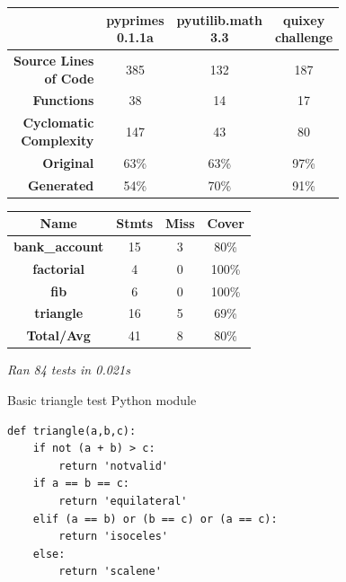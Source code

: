 \documentclass{icldt}
\numberwithin{equation}{section}       %
\begin{document}
{{\newcommand{\specialcell}[2][c]{%
  \begin{tabular}[#1]{@{}c@{}}#2\end{tabular}}
\begin{tabularx}{\textwidth}{ |r|c|c|c| }
	\hline
	& \specialcell{\textsf{pyprimes} \\ \textsf{0.1.1a}} & \specialcell{\textsf{pyutilib.math} \\ \textsf{3.3}} & \specialcell{\textsf{quixey} \\ \textsf{challenge}} \\
	\hline
	\specialcell{\textbf{Source Lines} \\ \textbf{of Code}} & 385 & 132 & 187 \\
	\hline
	\textbf{Functions} & 38 & 14 & 17 \\
	\hline
	\specialcell{\textbf{Cyclomatic} \\ \textbf{Complexity}} & 147 & 43 & 80 \\
	\hline
	\textbf{Original} & 63\% & 63\% & 97\% \\
	\hline	
	\textbf{Generated} & 54\% & 70\% & 91\% \\
	\hline
\end{tabularx}

\begin{tabularx}{\textwidth}{ |c|c|c|c| }
  \hline
  \textbf{Name} & \textbf{Stmts} & \textbf{Miss} & \textbf{Cover} \\
  \hline
  \textbf{bank_account} & 15 & 3 & 80\%  \\
  \hline
  \textbf{factorial} & 4 & 0 & 100\%  \\
  \hline
  \textbf{fib} & 6 & 0 & 100\%  \\
  \hline
  \textbf{triangle} & 16 & 5 & 69\%  \\
  \hline
  \textbf{Total/Avg} & 41 & 8 & 80\% \\
  \hline
\end{tabularx}
\emph{Ran 84 tests in 0.021s}

\begin{listing}[H]
	\caption{Basic triangle test Python module}
	\begin{verbatim}
def triangle(a,b,c):
    if not (a + b) > c:
        return 'notvalid'
    if a == b == c:
        return 'equilateral'
    elif (a == b) or (b == c) or (a == c):
        return 'isoceles'
    else:
        return 'scalene'
	\end{verbatim}
	\label{lst:py-triangle}
\end{listing}

}}
\end{document}
